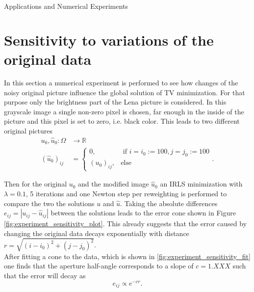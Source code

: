 \begin{chapter}{Applications and Numerical Experiments}
\section{Sensitivity to variations of the original data} %
\label{sec:Sensitivity}
In this section a numerical experiment is performed to see how changes of the noisy original picture influence the global solution of TV
minimization.
For that purpose only the brightness part of the Lena picture is considered. In this grayscale image a single non-zero pixel is chosen, far enough in the inside of the picture and this pixel is set to zero, i.e. black color. This leads to two different original pictures
\begin{align}
    u_0,\hat{u}_0:\Omega &\to\mathbb{R}\\
    (\hat{u}_0)_{ij}&=\begin{cases}
	0, & \text{ if } i=i_0:=100,j=j_0:=100\\
	(u_0)_{ij}, &\text{else}
    \end{cases}.
\end{align}

Then for the original $u_0$ and the modified image $\hat{u}_0$ an IRLS minimization with $\lambda=0.1$, 5 iterations and one Newton step per reweighting is
performed to compare the two the solutions $u$ and $\hat{u}$. Taking the absolute differences $e_{ij}=|u_{ij}-\hat{u}_{ij}|$ between the solutions
leads to the error cone shown in Figure \ref{fig:experiment_sensitivity_plot}. This already suggests that the
error caused by changing the original data decays exponentially with distance $r=\sqrt{(i-i_0)^{2}+(j-j_0)^{2}}$.\\

After fitting a cone to the data, which is shown in \ref{fig:experiment_sensitivity_fit}
one finds that the aperture half-angle corresponds to a slope of $c=1.XXX$ such that the error will decay as
\begin{equation}
    e_{ij}\propto e^{-cr}.
\end{equation}


\end{chapter}

